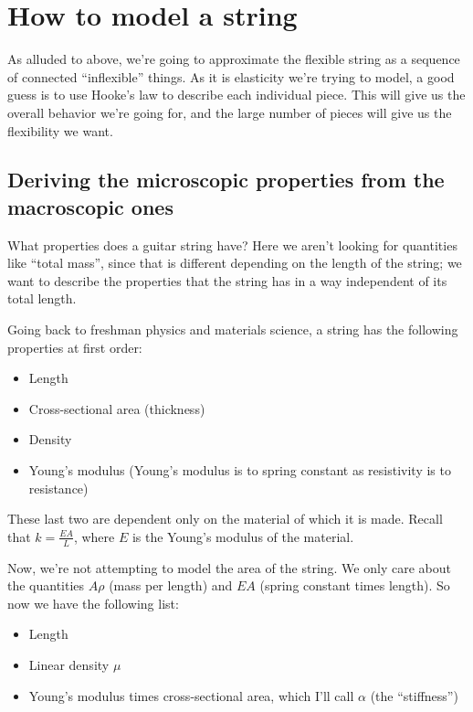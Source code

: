 \documentclass[12ampt]{article}
\begin{document}
\section{How to model a string}

As alluded to above, we’re going to approximate the flexible string as a sequence of connected
``inflexible'' things. As it is elasticity we’re trying to model, a good guess is to use Hooke’s
law to describe each individual piece. This will give us the overall behavior we’re going for,
and the large number of pieces will give us the flexibility we want.

\subsection{Deriving the microscopic properties from the macroscopic ones}

What properties does a guitar string have? Here we aren’t looking for quantities like ``total mass'',
since that is different depending on the length of the string; we want to describe the properties that the string has in a way independent of its total length.

Going back to freshman physics and materials science, a string has the following properties at first order:

\begin{itemize}
  \item{Length}
  \item{Cross-sectional area (thickness)}
  \item{Density}
  \item{Young's modulus} (Young's modulus is to spring constant as resistivity is to resistance)
\end{itemize}

These last two are dependent only on the material of which it is made.  Recall that
$k = \frac{EA}{L}$, where $E$ is the Young’s modulus of the material. 

Now, we’re not attempting to model the area of the string.  We only care about the quantities $A \rho$ (mass per length) and
$EA$ (spring constant times length). So now we have the following list:

\begin{itemize}
      \item{Length}
      \item{Linear density $\mu$}
      \item{Young's modulus times cross-sectional area, which I'll call $\alpha$ (the ``stiffness'')}
\end{itemize}
\end{document}
